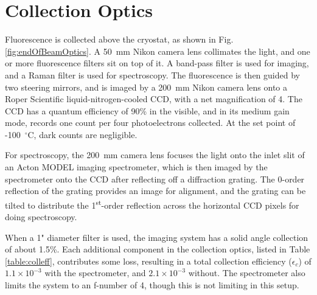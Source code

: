 
\section{Collection Optics}
\label{sec:collection}

Fluorescence is collected above the cryostat, as shown in Fig. \ref{fig:endOfBeamOptics}.  A 50~mm Nikon camera lens collimates the light, and one or more fluorescence filters sit on top of it.  A band-pass filter is used for imaging, and a Raman filter is used for spectroscopy.  The fluorescence is then guided by two steering mirrors, and is imaged by a 200~mm Nikon camera lens onto a Roper Scientific liquid-nitrogen-cooled CCD, with a net magnification of 4.  The CCD has a quantum efficiency of 90\% in the visible, and in its medium gain mode, records one count per four photoelectrons collected.  At the set point of -100~$^{\circ}$C, dark counts are negligible.

For spectroscopy, the 200~mm camera lens focuses the light onto the inlet slit of an Acton {\color{red}MODEL} imaging spectrometer, which is then imaged by the spectrometer onto the CCD after reflecting off a diffraction grating.  The 0-order reflection of the grating provides an image for alignment, and the grating can be tilted to distribute the 1\textsuperscript{st}-order reflection across the horizontal CCD pixels for doing spectroscopy.

When a 1" diameter filter is used, the imaging system has a solid angle collection of about 1.5\%.  Each additional component in the collection optics, listed in Table \ref{table:colleff}, contributes some loss, resulting in a total collection efficiency ($\epsilon_{c}$) of $1.1 \times 10^{-3}$ with the spectrometer, and $2.1 \times 10^{-3}$ without.  The spectrometer also limits the system to an f-number of 4, though this is not limiting in this setup.

